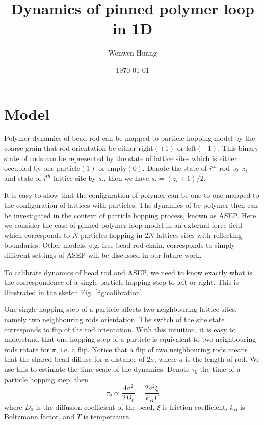 \documentclass[12pt,a4paper]{article}
\begin{document}
\title{Dynamics of pinned polymer loop in 1D}
\author{Wenwen Huang}
\date{\today}

\maketitle

\section{Model}
\label{sec:model}
Polymer dynamics of bead rod can be mapped to particle hopping model by the
coarse grain that rod orientation be either right$(+1)$ or left$(-1)$. This
binary state of rods can be represented by the state of lattice sites which is
either occupied by one particle$(1)$ or empty$(0)$. Denote the state of
$i^{th}$ rod by $z_i$ and state of $i^{th}$ lattice site by $s_i$, then we have
$s_i = (z_i + 1)/2$.

It is easy to show that the configuration of polymer can be one to one mapped to
the configuration of lattices with particles. The dynamics of be polymer then
can be investigated in the context of particle hopping process, known as ASEP.
Here we consider the case of pinned polymer loop model in an external force
field which corresponds to $N$ particles hopping in $2N$ lattices sites with
reflecting boundaries. Other models, e.g. free bead rod chain, corresponds to
simply different settings of ASEP will be discussed in our future work.  

To calibrate dynamics of bead rod and ASEP, we need to know exactly what is the
correspondence of a single particle hopping step to left or right. This is
illustrated in the sketch Fig. \ref{fig:calibration}

One single hopping step of a particle affects two neighbouring lattice sites,
namely two neighbouring rods orientation. The switch of the site state
corresponds to flip of the rod orientation. With this intuition, it is easy to
understand that one hopping step of a particle is equivalent to two neighbouring
rods rotate for $\pi$, i.e. a flip. Notice that a flip of two neighbouring
rods means that the shared bead diffuse for a distance of $2a$, where $a$ is
the length of rod. We use this to estimate the time scale of the dynamics.
Denote $\tau_0$ the time of a particle hopping step,  then 
\begin{equation}
    \label{eq:time_scale}
    \tau_0 \propto \frac{4a^2}{2D_0} = \frac{2a^2\xi}{k_B T}
\end{equation}
where $D_0$ is the diffusion coefficient of the bead, $\xi$ is friction
coefficient, $k_B$ is Boltzmann factor, and $T$ is temperature.
\end{document}
